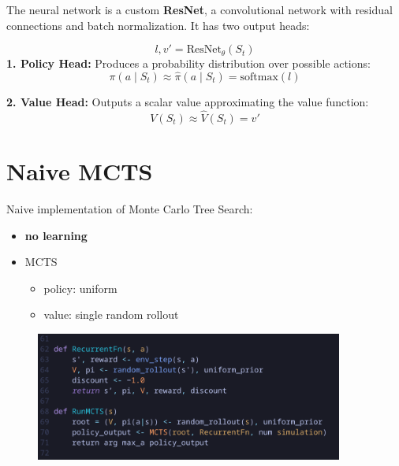 \documentclass[aspectratio=169,xcolor=dvipsnames]{beamer}
\begin{document}

\begin{frame}{}
The neural network is a custom \textbf{ResNet}, a convolutional network with residual connections and batch normalization. It has two output heads:

\medskip
\[
l, v' = \text{ResNet}_\theta(S_t)
\]
\medskip
\textbf{1. Policy Head:} Produces a probability distribution over possible actions:
\[
\pi(a \mid S_t) \approx \hat{\pi}(a \mid S_t) = \text{softmax}(l)
\]

\textbf{2. Value Head:} Outputs a scalar value approximating the value function:
\[
V(S_t) \approx \hat{V}(S_t) = v'
\]

\end{frame}

\section{Naive MCTS}


\begin{frame}{}
    Naive implementation of Monte Carlo Tree Search:

    \medskip
    \begin{itemize}
    \item \textbf{no learning}
    \item MCTS
            \begin{itemize}
                \item policy: uniform
                \item value: single random rollout
            \end{itemize}
\end{itemize}

\end{frame}


\begin{frame}{}
\begin{figure}[h]
    \centering
    \includegraphics[width=0.9\textwidth]{naive_mcts_algo.png}
    \label{fig:intro}
\end{figure}
\end{frame}
\end{document}
